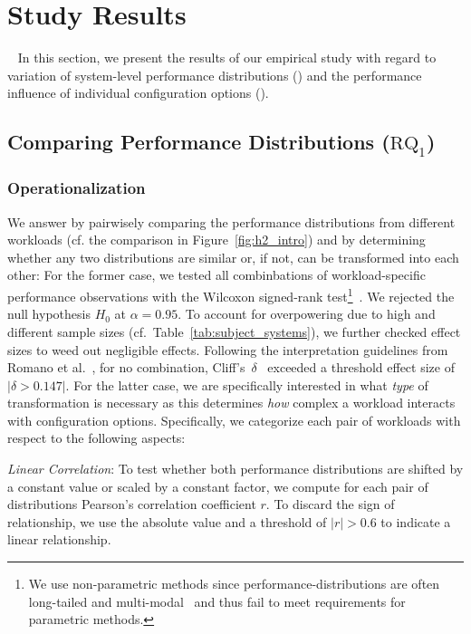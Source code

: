 {\section{Study Results}~\label{sec:results}
In this section, we present the results of our empirical study with regard to variation of system-level performance distributions () and the performance influence of individual configuration options ().

\subsection{Comparing Performance Distributions ($\text{RQ}_\text{1}$)}\label{sec:rq1}
\subsubsection{Operationalization}
We answer  by pairwisely comparing the performance distributions from different workloads (cf. the comparison in Figure~\ref{fig:h2_intro}) and by determining whether any two distributions are similar or, if not, can be transformed into each other: For the former case, we tested all combinbations of workload-specific performance observations with the Wilcoxon signed-rank test\footnote{We use non-parametric methods since performance-distributions are often long-tailed and multi-modal~\cite{curtsinger_stabilizer_2013,maricq2018taming} and thus fail to meet requirements for parametric methods.}~\cite{lovric_international_2010}. We rejected the null hypothesis $H_0$ at $\alpha=0.95$. To account for overpowering due to high and different sample sizes (cf.~Table~\ref{tab:subject_systems}), we further checked effect sizes to weed out negligible effects. Following the interpretation guidelines from Romano et al.~\cite{romano2006exploring}, for no combination, Cliff's~$\delta$~\cite{Cliff1993DominanceSO} exceeded a threshold effect size of $\vert\delta > 0.147\vert$.
For the latter case, we are specifically interested in what \textit{type} of transformation is necessary as this determines \textit{how} complex a workload interacts with configuration options. Specifically, we categorize each pair of workloads with respect to the following aspects: 

\begin{compactenum}

	\item \textit{Linear Correlation}: To test whether both performance distributions are shifted by a constant value or scaled by a constant factor, we compute for each pair of distributions Pearson's correlation coefficient $r$. To discard the sign of relationship, we use the absolute value and a threshold of $\vert r\vert >0.6$ to indicate a linear relationship.
	

\end{compactenum}}
